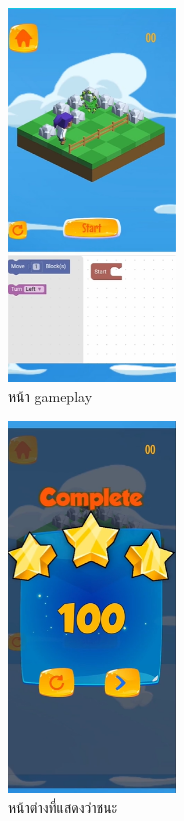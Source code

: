 \begin{figure}[h!]
\begin{center}
\includegraphics[width=1.75in]{pic/NewGamePlay.png}
\end{center}
\caption[หน้า Gameplay]{หน้า gameplay}
\label{game}
\end{figure}

\begin{figure}[h!]
\begin{center}
\includegraphics[width=1.75in]{pic/Complete.png}
\end{center}
\caption[หน้าต่างที่แสดงว่าชนะ]{หน้าต่างที่แสดงว่าชนะ}
\label{win}
\end{figure}

